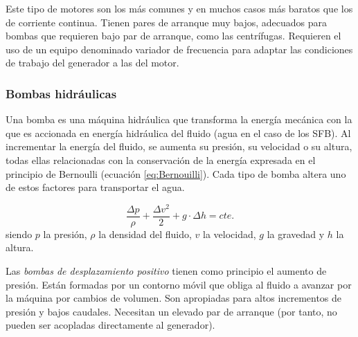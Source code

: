 Este tipo de motores son los más comunes y en muchos casos más baratos
que los de corriente continua. Tienen pares de arranque muy bajos,
adecuados para bombas que requieren bajo par de arranque, como las
centrífugas. Requieren el uso de un equipo denominado variador de
frecuencia para adaptar las condiciones de trabajo del generador a
las del motor. 


\subsubsection{Bombas hidráulicas}

Una bomba es una máquina hidráulica que transforma la energía mecánica
con la que es accionada en energía hidráulica del fluido (agua en
el caso de los SFB). Al incrementar la energía del fluido, se aumenta
su presión, su velocidad o su altura, todas ellas relacionadas con
la conservación de la energía expresada en el principio de Bernoulli
(ecuación \ref{eq:Bernouilli}). Cada tipo de bomba altera uno de
estos factores para transportar el agua. 

\begin{equation}
\frac{\Delta p}{\rho}+\frac{\Delta v^2}{2}+g\cdot\Delta h=cte.\label{eq:Bernouilli}\end{equation}
siendo $p$ la presión, $\rho$ la densidad del fluido, $v$ la velocidad,
$g$ la gravedad y $h$ la altura.

Las \emph{bombas de desplazamiento positivo} tienen como principio
el aumento de presión. Están formadas por un contorno móvil que obliga
al fluido a avanzar por la máquina por cambios de volumen. Son apropiadas
para altos incrementos de presión y bajos caudales. Necesitan un elevado
par de arranque (por tanto, no pueden ser acopladas directamente al
generador).

